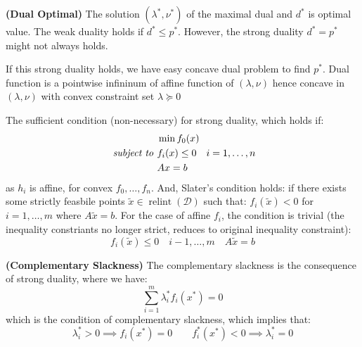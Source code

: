 \begin{definition}{\textbf{(Dual Optimal)}}
    The solution $(\lambda^*, \nu^*)$ of the maximal dual and $d^*$ is optimal value. The weak duality holds if $d^*\le p^*$. However, the strong duality $d^*=p^*$ might not always holds.
\end{definition}

\begin{remark}
    If this strong duality holds, we have easy concave dual problem to find $p^*$. Dual function is a pointwise infininum of affine function of $(\lambda, \nu)$ hence concave in $(\lambda,\nu)$ with convex constraint set $\lambda\succeq0$
\end{remark}

\begin{proposition}
    The sufficient condition (non-necessary) for strong duality, which holds if:
    \begin{equation*}
    \begin{aligned}
        &\min f_0(x) \\
        \text{\emph{ subject to }}& \begin{aligned}[t]      
            &f_i(x)\le 0 \quad i=1,\dots,n \\
            &Ax=b
        \end{aligned}
    \end{aligned}
    \end{equation*}
    as $h_i$ is affine, for convex $f_0,\dots,f_n$. And, Slater's condition holds: if there exists some strictly feasbile points $\tilde{x}\in\operatorname{relint}(\mathcal{D})$ such that: $f_i(\tilde{x}) < 0$ for $i=1,\dots,m$ where $A\tilde{x}=b$. For the case of affine $f_i$, the condition is trivial (the inequality constriants no longer strict, reduces to original inequality constraint): 
    \begin{equation*}
        f_i(\tilde{x}) \le 0 \quad i-1,\dots,m \quad A\tilde{x}=b
    \end{equation*}
\end{proposition}
\begin{proposition}{\textbf{(Complementary Slackness)}}
    The complementary slackness is the consequence of strong duality, where we have:
    \begin{equation*}
        \sum^m_{i=1}\lambda_i^*f_i(x^*) = 0
    \end{equation*}
    which is the condition of complementary slackness, which implies that:
    \begin{equation*}
        \lambda_i^*>0\implies f_i(x^*)=0 \qquad f_i^*(x^*)<0 \implies \lambda^*_i=0
    \end{equation*}
\end{proposition}
